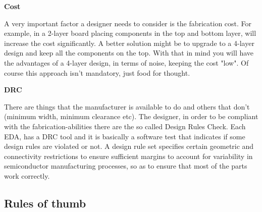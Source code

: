 \documentclass[final]{cubedoc}
\begin{document}
	\textbf{Cost}
	
	A very important factor a designer needs to consider is the fabrication cost. For example, in a 2-layer board placing components in the top and bottom layer, will increase the cost significantly. A better solution might be to upgrade to a 4-layer design and keep all the components on the top. With that in mind you will have the advantages of a 4-layer design, in terms of noise, keeping the cost "low". Of course this approach isn't mandatory, just food for thought.
	
	\textbf{DRC}
	
	There are things that the manufacturer is available to do and others that don't (minimum width, minimum clearance etc). The designer, in order to be compliant with the fabrication-abilities there are the so called Design Rules Check. Each EDA, has a DRC tool and it is basically a software test that indicates if some design rules are violated or not. A design rule set specifies certain geometric and connectivity restrictions to ensure sufficient margins to account for variability in semiconductor manufacturing processes, so as to ensure that most of the parts work correctly. 
	
	
	
	
	
	\subsection{Rules of thumb}
	\label{subsec:thumb}
	
\end{document}
